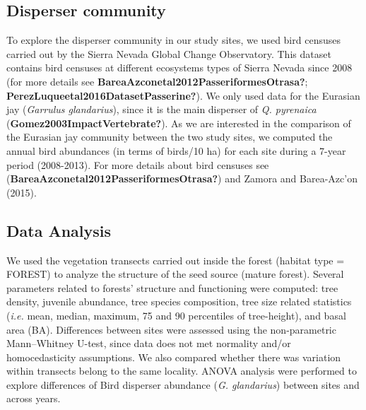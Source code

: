\documentclass[
]{article}
\begin{document}
\hypertarget{disperser-community}{%
\subsection{Disperser community}\label{disperser-community}}

To explore the disperser community in our study sites, we used bird
censuses carried out by the Sierra Nevada Global Change Observatory.
This dataset contains bird censuses at different ecosystems types of
Sierra Nevada since 2008 (for more details see
\textbf{BareaAzconetal2012PasseriformesOtrasa?};
\textbf{PerezLuqueetal2016DatasetPasserine?}). We only used data for the
Eurasian jay (\emph{Garrulus glandarius}), since it is the main
disperser of \emph{Q. pyrenaica} (\textbf{Gomez2003ImpactVertebrate?}).
As we are interested in the comparison of the Eurasian jay community
between the two study sites, we computed the annual bird abundances (in
terms of birds/10 ha) for each site during a 7-year period (2008-2013).
For more details about bird censuses see
(\textbf{BareaAzconetal2012PasseriformesOtrasa?}) and Zamora and
Barea-Azc'on (2015).

\hypertarget{data-analysis}{%
\subsection{Data Analysis}\label{data-analysis}}

We used the vegetation transects carried out inside the forest (habitat
type = FOREST) to analyze the structure of the seed source (mature
forest). Several parameters related to forests' structure and
functioning were computed: tree density, juvenile abundance, tree
species composition, tree size related statistics (\emph{i.e.} mean,
median, maximum, 75 and 90 percentiles of tree-height), and basal area
(BA). Differences between sites were assessed using the non-parametric
Mann--Whitney U-test, since data does not met normality and/or
homocedasticity assumptions. We also compared whether there was
variation within transects belong to the same locality. ANOVA analysis
were performed to explore differences of Bird disperser abundance
(\emph{G. glandarius}) between sites and across years.
\end{document}
